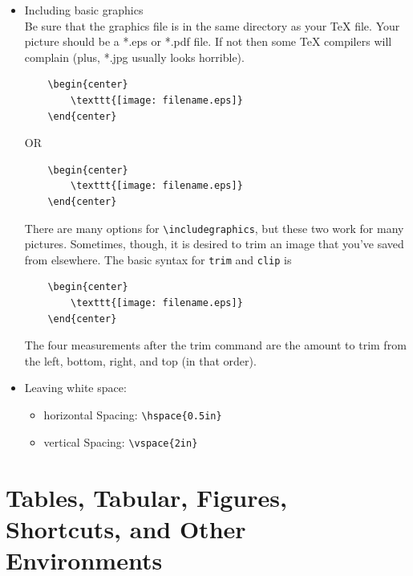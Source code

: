 \begin{itemize}
    \item Including basic graphics \\  
        Be sure that the graphics file is in the same directory as your TeX
        file. Your picture should be a *.eps or *.pdf file. If not then some TeX
        compilers will complain (plus, *.jpg usually looks horrible).
\begin{verbatim}
    \begin{center}
        \texttt{[image: filename.eps]}
    \end{center}
\end{verbatim}
OR
\begin{verbatim}
    \begin{center}
        \texttt{[image: filename.eps]}
    \end{center}
\end{verbatim}
        There are many options for \verb|\includegraphics|, but these two
        work for many pictures.  Sometimes, though, it is desired to trim an image that
        you've saved from elsewhere.  The basic syntax for \texttt{trim} and \texttt{clip}
         is
\begin{verbatim}
    \begin{center}
        \texttt{[image: filename.eps]}
    \end{center}
\end{verbatim}
        The four measurements after the trim command are the amount to trim from the left,
        bottom, right, and top (in that order).




    \item Leaving white space:
        \begin{itemize}
            \item horizontal Spacing: \verb|\hspace{0.5in}|
            \item vertical Spacing: \verb|\vspace{2in}|
        \end{itemize}

\end{itemize}



\section{Tables, Tabular, Figures, Shortcuts, and Other Environments}

